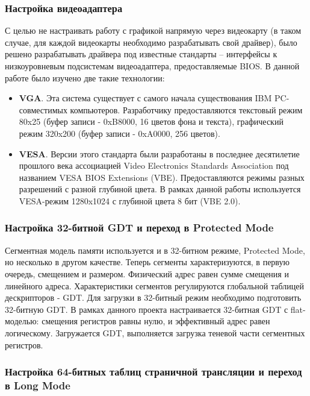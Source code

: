 \documentclass[a4paper,12pt]{extarticle}
\begin{document}
	\subsubsection{Настройка видеоадаптера} \label{ssb:video}
		С целью не настраивать работу с графикой напрямую через видеокарту (в таком случае, для каждой видеокарты необходимо разрабатывать свой драйвер), было решено разрабатывать драйвера под известные стандарты -- интерфейсы к низкоуровневым подсистемам видеоадаптера, предоставляемые BIOS. В данной работе было изучено две такие технологии:
		\begin{itemize}
			\item \textbf{VGA}. Эта система существует с самого начала существования IBM PC-совместимых компьютеров. Разработчику предоставляются текстовый режим 80x25 (буфер записи - 0xB8000, 16 цветов фона и текста), графический режим 320x200 (буфер записи - 0xA0000, 256 цветов).
			\item \textbf{VESA}. Версии этого стандарта были разработаны в последнее десятилетие прошлого века ассоциацией Video Electronics Standards Association под названием VESA BIOS Extensions (VBE). Предоставляются режимы разных разрешений с разной глубиной цвета. В рамках данной работы используется VESA-режим 1280x1024 с глубиной цвета 8 бит (VBE 2.0).
		\end{itemize}
	\subsubsection{Настройка 32-битной GDT и переход в Protected Mode}  \label{ssb:pm}
		Сегментная модель памяти используется и в 32-битном режиме, Protected Mode, но несколько в другом качестве. Теперь сегменты характеризуются, в первую очередь, смещением и размером. Физический адрес равен сумме смещения и линейного адреса. Характеристики сегментов регулируются глобальной таблицей дескрипторов - GDT. Для загрузки в 32-битный режим необходимо подготовить 32-битную GDT. В рамках данного проекта настраивается 32-битная GDT с flat-моделью: смещения регистров равны нулю, и эффективный адрес равен логическому. Загружается GDT, выполняется загрузка теневой части сегментных регистров.
		
	\subsubsection{Настройка 64-битных таблиц страничной трансляции и переход в Long Mode}
	
\end{document}
